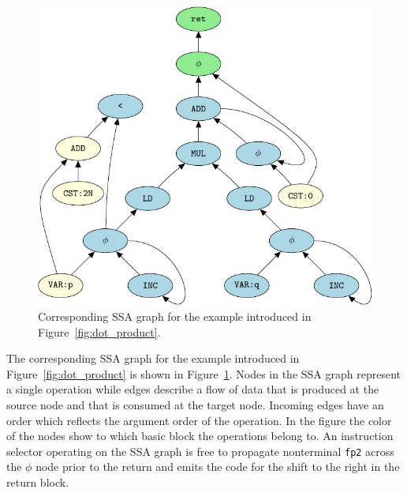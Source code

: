 \begin{figure}
\begin{center}

    \includegraphics{pgf-fig004}
  \end{center}
  \caption{Corresponding SSA graph for the example introduced in
    Figure~\ref{fig:dot_product}.}\label{fig:ssa_graph}
\end{figure}

The corresponding SSA graph for the example introduced in
Figure~\ref{fig:dot_product} is shown in Figure~\ref{fig:ssa_graph}.
Nodes in the SSA graph represent a single operation while edges
describe a flow of data that is produced at the source node and that
is consumed at the target node. Incoming edges have an order which reflects the argument
order of the operation. In the figure the color of the nodes
show to which basic block the operations belong to. An instruction
selector operating on the SSA graph is free to propagate nonterminal \texttt{fp2}
across the $\phi$ node prior to the return and emits the
code for the shift to the right in the return block.

